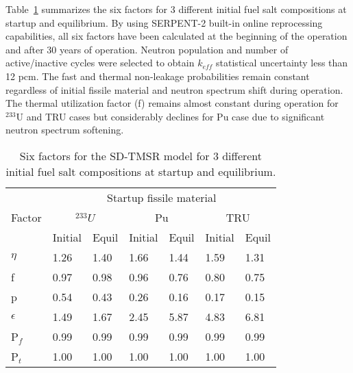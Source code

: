 Table~\ref{tab:six_factor} summarizes the six factors for 3 different initial 
fuel salt compositions at startup and equilibrium. By using SERPENT-2 built-in 
online reprocessing capabilities, all six factors have been calculated at the 
beginning of the operation and after 30 years of operation. Neutron population 
and number of active/inactive cycles were selected to obtain $k_{eff}$ 
statistical uncertainty less than 12 pcm. The fast and thermal non-leakage 
probabilities  remain constant regardless of initial fissile material and 
neutron spectrum shift during operation. The thermal utilization factor (f) 
remains almost constant during operation for $^{233}$U and TRU cases but 
considerably declines for Pu case due to significant neutron spectrum 
softening.
\begin{table} [ht!]
	\caption{Six factors for the SD-TMSR model for 3 different initial 
		fuel salt compositions at startup and equilibrium.}
	\begin{tabularx}{\textwidth}{ X | X X  X X  X X } \hline
		\multirow{3}{*}{Factor}  & \multicolumn{6}{c}{Startup fissile 
			material} \\ \cline{2-7}
		\space  & \multicolumn{2}{c}{$^{233}U$} & \multicolumn{2}{c}{Pu} & 
		\multicolumn{2}{c}{TRU} \\ \cline{2-7}
		\space  & Initial & Equil & Initial & Equil & Initial & Equil \\ \hline
		$\eta$  & 1.26 & 1.40 & 1.66 & 1.44 & 1.59 & 1.31 \\ 
		f       & 0.97 & 0.98 & 0.96 & 0.76 & 0.80 & 0.75 \\
		p       & 0.54 & 0.43 & 0.26 & 0.16 & 0.17 & 0.15 \\
		$\epsilon$ & 1.49 & 1.67 & 2.45 & 5.87 & 4.83 & 6.81 \\
		P$_f$   & 0.99 & 0.99 & 0.99 & 0.99& 0.99 & 0.99 \\
		P$_t$   & 1.00 & 1.00 & 1.00 & 1.00 & 1.00 & 1.00 \\ \hline
	\end{tabularx}
	\label{tab:six_factor}
\end{table}


